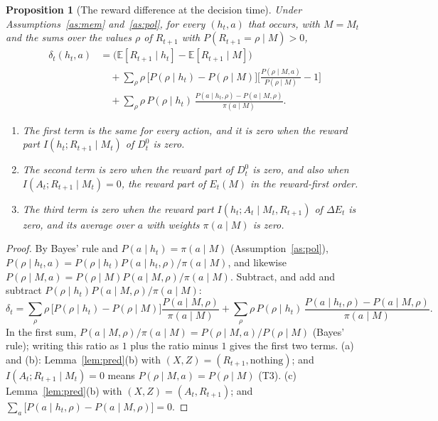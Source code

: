 \documentclass{article}
\newtheorem{proposition}{Proposition}[section]
\theoremstyle{definition}
\theoremstyle{remark}
\newcommand{\E}{\mathbb{E}}
\newcommand{\dE}{\Delta E}
\begin{document}
\begin{proposition}[The reward difference at the decision time]\label{prop:delta-split}
Under Assumptions~\ref{as:mem} and~\ref{as:pol}, for every $(h_t,a)$ that occurs, with $M=M_t$ and the sums over the values $\rho$ of $R_{t+1}$ with $P(R_{t+1}=\rho\mid M)>0$,
\begin{align*}
\delta_t(h_t,a)&=\big(\E[R_{t+1}\mid h_t]-\E[R_{t+1}\mid M]\big)\\
&\quad+\sum_\rho\rho\,\big[P(\rho\mid h_t)-P(\rho\mid M)\big]\Big[\frac{P(\rho\mid M,a)}{P(\rho\mid M)}-1\Big]\\
&\quad+\sum_\rho\rho\,P(\rho\mid h_t)\,\frac{P(a\mid h_t,\rho)-P(a\mid M,\rho)}{\pi(a\mid M)}.
\end{align*}
\begin{enumerate}
\item[(a)] The first term is the same for every action, and it is zero when the reward part $I(h_t;R_{t+1}\mid M_t)$ of $D^0_t$ is zero.
\item[(b)] The second term is zero when the reward part of $D^0_t$ is zero, and also when $I(A_t;R_{t+1}\mid M_t)=0$, the reward part of $E_t(M)$ in the reward-first order.
\item[(c)] The third term is zero when the reward part $I(h_t;A_t\mid M_t,R_{t+1})$ of $\dE_t$ is zero, and its average over $a$ with weights $\pi(a\mid M)$ is zero.
\end{enumerate}
\end{proposition}

\begin{proof}
By Bayes' rule and $P(a\mid h_t)=\pi(a\mid M)$ (Assumption~\ref{as:pol}), $P(\rho\mid h_t,a)=P(\rho\mid h_t)P(a\mid h_t,\rho)/\pi(a\mid M)$, and likewise $P(\rho\mid M,a)=P(\rho\mid M)P(a\mid M,\rho)/\pi(a\mid M)$. Subtract, and add and subtract $P(\rho\mid h_t)P(a\mid M,\rho)/\pi(a\mid M)$:
\[
\delta_t=\sum_\rho\rho\,\big[P(\rho\mid h_t)-P(\rho\mid M)\big]\frac{P(a\mid M,\rho)}{\pi(a\mid M)}+\sum_\rho\rho\,P(\rho\mid h_t)\,\frac{P(a\mid h_t,\rho)-P(a\mid M,\rho)}{\pi(a\mid M)}.
\]
In the first sum, $P(a\mid M,\rho)/\pi(a\mid M)=P(\rho\mid M,a)/P(\rho\mid M)$ (Bayes' rule); writing this ratio as $1$ plus the ratio minus $1$ gives the first two terms. (a) and (b): Lemma~\ref{lem:pred}(b) with $(X,Z)=(R_{t+1},\text{nothing})$; and $I(A_t;R_{t+1}\mid M_t)=0$ means $P(\rho\mid M,a)=P(\rho\mid M)$ (T3). (c) Lemma~\ref{lem:pred}(b) with $(X,Z)=(A_t,R_{t+1})$; and $\sum_a\big[P(a\mid h_t,\rho)-P(a\mid M,\rho)\big]=0$.
\end{proof}
\end{document}
